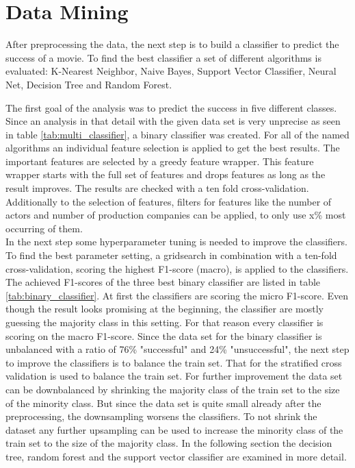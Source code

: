 \chapter{Data Mining}
\label{cha:data_mining}

After preprocessing the data, the next step is to build a classifier to predict the success of a movie. To find the best classifier a set of different algorithms is evaluated:
K-Nearest Neighbor, 
Naive Bayes, 
Support Vector Classifier, 
Neural Net, 
Decision Tree and 
Random Forest.

The first goal of the analysis was to predict the success in five different classes. Since an analysis in that detail with the given data set is very unprecise as seen in table \ref{tab:multi_classifier}, a binary classifier was created.
For all of the named algorithms an individual feature selection is applied to get the best results. The important features are selected by a greedy feature wrapper. This feature wrapper starts with the full set of features and drops features as long as the result improves. The results are checked with a ten fold cross-validation. Additionally to the selection of features, filters for features like the number of actors and number of production companies can be applied, to only use x\% most occurring of them. \\
In the next step some hyperparameter tuning is needed to improve the classifiers. To find the best parameter setting, a gridsearch in combination with a ten-fold cross-validation, scoring the highest F1-score (macro), is applied to the classifiers.
The achieved F1-scores of the three best binary classifier are listed in table \ref{tab:binary_classifier}. 
At first the classifiers are scoring the micro F1-score. Even though the result looks promising at the beginning, the classifier are mostly guessing the majority class in this setting. For that reason every classifier is scoring on the macro F1-score. Since the data set for the binary classifier is unbalanced with a ratio of 76\% "successful" and 24\% "unsuccessful", the next step to improve the classifiers is to balance the train set. That for the stratified cross validation is used to balance the train set. For further improvement the data set can be downbalanced by shrinking the majority class of the train set to the size of the minority class. But since the data set is quite small already after the preprocessing, the downsampling worsens the classifiers. To not shrink the dataset any further upsampling can be used to increase the minority class of the train set to the size of the majority class. In the following section the decision tree, random forest and the support vector classifier are examined in more detail.

